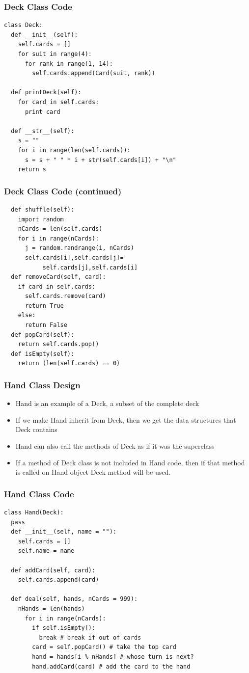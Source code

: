 \documentclass{beamer}
\newcommand\Fontvi{\fontsize{6}{6}\selectfont}
\begin{document}
\begin{frame}[fragile]
\frametitle{Deck Class Code}
\begin{lstlisting}
class Deck:
  def __init__(self):
    self.cards = []
    for suit in range(4):
      for rank in range(1, 14):
        self.cards.append(Card(suit, rank))

  def printDeck(self):
    for card in self.cards:
      print card 

  def __str__(self):
    s = ""
    for i in range(len(self.cards)):
      s = s + " " * i + str(self.cards[i]) + "\n"
    return s

\end{lstlisting}
\end{frame}

\begin{frame}[fragile]
\frametitle{Deck Class Code (continued)}
\Fontvi
\begin{lstlisting}
  def shuffle(self):
    import random
    nCards = len(self.cards)
    for i in range(nCards):
      j = random.randrange(i, nCards)
      self.cards[i],self.cards[j]=
           self.cards[j],self.cards[i]
  def removeCard(self, card):
    if card in self.cards:
      self.cards.remove(card)
      return True
    else:
      return False
  def popCard(self):
    return self.cards.pop()
  def isEmpty(self):
    return (len(self.cards) == 0)
\end{lstlisting}
\end{frame}

\begin{frame}[fragile]
\frametitle{Hand Class Design}
\begin{itemize}
\item Hand is an example of a Deck, a subset of the complete deck
\item If we make Hand inherit from Deck, then we get the data structures that Deck contains
\item Hand can also call the methods of Deck as if it was the superclass
\item If a method of Deck class is not included in Hand code, then if that method is called on Hand object Deck method will be used.
\end{itemize} 
\end{frame}

\begin{frame}[fragile]
\frametitle{Hand Class Code}
\Fontvi
\begin{lstlisting}
class Hand(Deck):
  pass
  def __init__(self, name = ""):
    self.cards = []
    self.name = name

  def addCard(self, card):
    self.cards.append(card)

  def deal(self, hands, nCards = 999):
    nHands = len(hands)
      for i in range(nCards):
        if self.isEmpty():
          break # break if out of cards
        card = self.popCard() # take the top card
        hand = hands[i % nHands] # whose turn is next?
        hand.addCard(card) # add the card to the hand
\end{lstlisting}
\end{frame}
\end{document}
